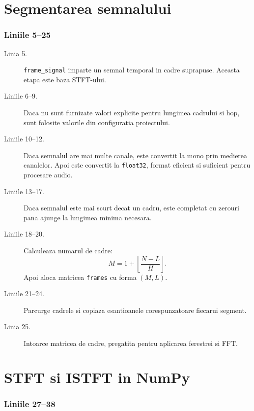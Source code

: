 \documentclass[12pt,a4paper]{report}
\newcommand{\codechunk}[2]{%
\subsection*{Liniile #1--#2}

}
\begin{document}
\chapter{Segmentarea semnalului}

\codechunk{5}{25}

\begin{description}
    \item[Linia 5.] \texttt{frame\_signal} imparte un semnal temporal in cadre
    suprapuse. Aceasta etapa este baza STFT-ului.

    \item[Liniile 6--9.] Daca nu sunt furnizate valori explicite pentru lungimea
    cadrului si hop, sunt folosite valorile din configuratia proiectului.

    \item[Liniile 10--12.] Daca semnalul are mai multe canale, este convertit la
    mono prin medierea canalelor. Apoi este convertit la \texttt{float32}, format
    eficient si suficient pentru procesare audio.

    \item[Liniile 13--17.] Daca semnalul este mai scurt decat un cadru, este completat
    cu zerouri pana ajunge la lungimea minima necesara.

    \item[Liniile 18--20.] Calculeaza numarul de cadre:
    \[
    M = 1 + \left\lfloor \frac{N-L}{H} \right\rfloor.
    \]
    Apoi aloca matricea \texttt{frames} cu forma \((M,L)\).

    \item[Liniile 21--24.] Parcurge cadrele si copiaza esantioanele corespunzatoare
    fiecarui segment.

    \item[Linia 25.] Intoarce matricea de cadre, pregatita pentru aplicarea ferestrei
    si FFT.
\end{description}

\chapter{STFT si ISTFT in NumPy}

\codechunk{27}{38}
\end{document}
